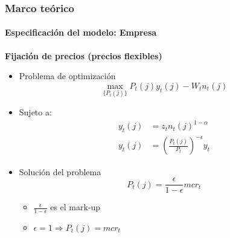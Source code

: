 \documentclass[10pt]{beamer}
\begin{document}
 \begin{frame}
\frametitle{Marco teórico}
\framesubtitle{Especificación del modelo: Empresa}
\textbf{Fijación de precios (precios flexibles)}
\begin{itemize}
\item<1-> Problema de optimización
\begin{equation*}
\max_{\{P_{t}(j)\}} P_{t}(j) y_{t}(j)- W_{t} n_{t}(j)   
\end{equation*}
\item<2-> Sujeto a:
\begin{align*}
y_{t}(j)&=z_{t}n_{t}(j)^{1-\alpha}\\
y_{t}(j)&= \left( \frac{P_{t}(j)}{P_{t}} \right)^{-\epsilon}y_{t}
\end{align*}
\item<3-> Solución del problema
\begin{equation*}
P_{t}(j)=\frac{\epsilon}{1-\epsilon}mcr_{t}
\end{equation*}
\begin{itemize}
\item<4-> $\frac{\epsilon}{1-\epsilon}$ es el mark-up
\item<4-> $\epsilon=1\Rightarrow P_{t}(j)=mcr_{t}$
\end{itemize}
\end{itemize}
\end{frame}
 
\end{document}
